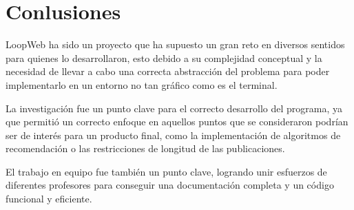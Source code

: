 \section{Conlusiones}
LoopWeb ha sido un proyecto que ha supuesto un gran reto en diversos sentidos para quienes lo desarrollaron, esto debido a su complejidad conceptual y la necesidad de llevar a cabo una correcta abstracción del problema para poder implementarlo en un entorno no tan gráfico como es el terminal.

La investigación fue un punto clave para el correcto desarrollo del programa, ya que permitió un correcto enfoque en aquellos puntos que se consideraron podrían ser de interés para un producto final, como la implementación de algoritmos de recomendación o las restricciones de longitud de las publicaciones.

El trabajo en equipo fue también un punto clave, logrando unir esfuerzos de diferentes profesores para conseguir una documentación completa y un código funcional y eficiente.